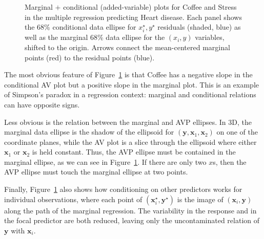 \documentclass[
  letterpaper,
  10pt,
  krantz2]{krantz}
\begin{document}
\begin{figure}[H]


\caption{\label{fig-coffee-mcplot}Marginal \(+\) conditional
(added-variable) plots for Coffee and Stress in the multiple regression
predicting Heart disease. Each panel shows the 68\% conditional data
ellipse for \(x_i^\star, y^\star\) residuals (shaded, blue) as well as
the marginal 68\% data ellipse for the \((x_i, y)\) variables, shifted
to the origin. Arrows connect the mean-centered marginal points (red) to
the residual points (blue).}

\end{figure}%

The most obvious feature of Figure~\ref{fig-coffee-mcplot} is that
Coffee has a negative slope in the conditional AV plot but a positive
slope in the marginal plot. This is an example of Simpson's paradox in a
regression context: marginal and conditional relations can have opposite
signs. 

Less obvious is the relation between the marginal and AVP ellipses. In
3D, the marginal data ellipse is the shadow of the ellipsoid for
\((\mathbf{y}, \mathbf{x}_1, \mathbf{x}_2)\) on one of the coordinate
planes, while the AV plot is a slice through the ellipsoid where either
\(\mathbf{x}_1\) or \(\mathbf{x}_2\) is held constant. Thus, the AVP
ellipse must be contained in the marginal ellipse, as we can see in
Figure~\ref{fig-coffee-mcplot}. If there are only two \(x\)s, then the
AVP ellipse must touch the marginal ellipse at two points.

Finally, Figure~\ref{fig-coffee-mcplot} also shows how conditioning on
other predictors works for individual observations, where each point of
\((\mathbf{x}_i^\star, \mathbf{y}^\star)\) is the image of
\((\mathbf{x}_i, \mathbf{y})\) along the path of the marginal
regression. The variability in the response and in the focal predictor
are both reduced, leaving only the uncontaminated relation of
\(\mathbf{y}\) with \(\mathbf{x}_i\).
\end{document}
